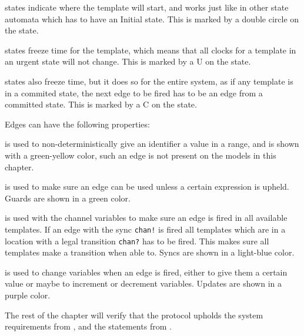 \begin{description}[labelindent=\parindent]
	\item [Initial] states indicate where the template will start, and works just like in other state automata which has to have an Initial state. This is marked by a double circle on the state.
	\item [Urgent] states freeze time for the template, which means that all clocks for a template in an urgent state will not change. This is marked by a U on the state.
	\item [Committed] states also freeze time, but it does so for the entire system, as if any template is in a commited state, the next edge to be fired has to be an edge from a committed state. This is marked by a C on the state.
\end{description}

\noindent
Edges can have the following properties:

\begin{description}[labelindent=\parindent,labelsep=1ex]
    \item[Select] is used to non-deterministically give an identifier a value in a range, and is shown with a green-yellow color, such an edge is not present on the models in this chapter.
    \item[Guard] is used to make sure an edge can be used unless a certain expression is upheld. Guards are shown in a green color.
    \item[Sync] is used with the channel variables to make sure an edge is fired in all available templates. If an edge with the sync \texttt{chan!} is fired all templates which are in a location with a legal transition \texttt{chan?} has to be fired. This makes sure all templates make a transition when able to. Syncs are shown in a light-blue color.
    \item[Update] is used to change variables when an edge is fired, either to give them a certain value or maybe to increment or decrement variables. Updates are shown in a purple color.
\end{description}

\noindent
The rest of the chapter will verify that the protocol upholds the system requirements from , and the statements from .
